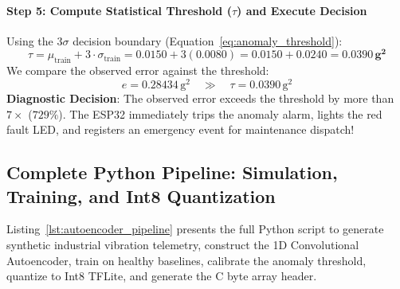 \begin{example}
\paragraph{Step 5: Compute Statistical Threshold ($\tau$) and Execute Decision}
Using the $3\sigma$ decision boundary (Equation~\eqref{eq:anomaly_threshold}):
\begin{equation*}
\tau = \mu_{\text{train}} + 3 \cdot \sigma_{\text{train}} = 0.0150 + 3(0.0080) = 0.0150 + 0.0240 = \mathbf{0.0390\,\text{g}^2}
\end{equation*}
We compare the observed error against the threshold:
\begin{equation*}
e = 0.28434\,\text{g}^2 \quad \gg \quad \tau = 0.0390\,\text{g}^2
\end{equation*}
\textbf{Diagnostic Decision}: The observed error exceeds the threshold by more than $7\times$ ($729\%$). The ESP32 immediately trips the anomaly alarm, lights the red fault LED, and registers an emergency event for maintenance dispatch!
\end{example}

\subsection{Complete Python Pipeline: Simulation, Training, and Int8 Quantization}\label{subsec:p3_python_code}

Listing~\ref{lst:autoencoder_pipeline} presents the full Python script to generate synthetic industrial vibration telemetry, construct the 1D Convolutional Autoencoder, train on healthy baselines, calibrate the anomaly threshold, quantize to Int8 TFLite, and generate the C byte array header.

